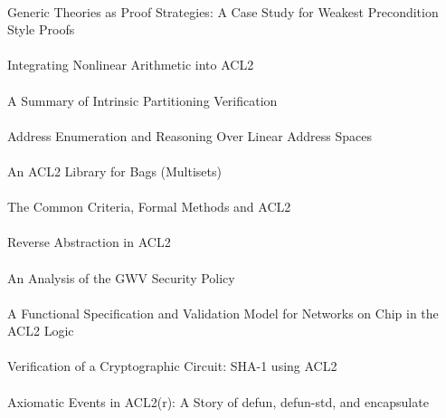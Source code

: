 \documentclass{article}
\begin{document}
\cite{04-legato-preconditions} \\
Generic Theories as Proof Strategies: A Case Study for Weakest Precondition Style Proofs \\

\cite{04-hunt-nonlinear} \\
Integrating Nonlinear Arithmetic into ACL2 \\

\cite{04-greve-partitioning} \\
A Summary of Intrinsic Partitioning Verification \\

\cite{04-greve-enumeration} \\
Address Enumeration and Reasoning Over Linear Address Spaces \\

\cite{04-smith-bags} \\
An ACL2 Library for Bags (Multisets) \\

\cite{04-richards-common} \\
The Common Criteria, Formal Methods and ACL2 \\

\cite{04-young-abstract} \\
Reverse Abstraction in ACL2 \\

\cite{04-foss-gwv} \\
An Analysis of the GWV Security Policy \\

\cite{04-schmaltz-network} \\
A Functional Specification and Validation Model for Networks on Chip in the ACL2 Logic \\

\cite{04-toma-sha} \\
Verification of a Cryptographic Circuit: SHA-1 using ACL2 \\

\cite{04-gamboa-axiomatic} \\
Axiomatic Events in ACL2(r): A Story of defun, defun-std, and encapsulate \\
\end{document}

